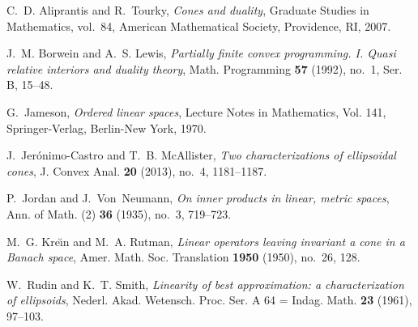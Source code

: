 \documentclass[10pt]{amsart}
\theoremstyle{definition}
\theoremstyle{remark}
\begin{document}
\providecommand{\bysame}{\leavevmode\hbox to3em{\hrulefill}\thinspace}
\providecommand{\MR}{\relax\ifhmode\unskip\space\fi MR }
\providecommand{\MRhref}[2]{  \href{http://www.ams.org/mathscinet-getitem?mr=#1}{#2}
}
\providecommand{\href}[2]{#2}
\begin{thebibliography}{1}

C.~D. Aliprantis and R.~Tourky, \emph{Cones and duality}, Graduate Studies in
  Mathematics, vol.~84, American Mathematical Society, Providence, RI, 2007.

J.~M. Borwein and A.~S. Lewis, \emph{Partially finite convex programming. {I}.
  {Q}uasi relative interiors and duality theory}, Math. Programming \textbf{57}
  (1992), no.~1, Ser. B, 15--48.

G.~Jameson, \emph{Ordered linear spaces}, Lecture Notes in Mathematics, Vol.
  141, Springer-Verlag, Berlin-New York, 1970.

J.~Jer{\'o}nimo-Castro and T.~B. McAllister, \emph{Two characterizations of
  ellipsoidal cones}, J. Convex Anal. \textbf{20} (2013), no.~4, 1181--1187.

P.~Jordan and J.~Von~Neumann, \emph{On inner products in linear, metric
  spaces}, Ann. of Math. (2) \textbf{36} (1935), no.~3, 719--723.

M.~G. Kre{\u\i}n and M.~A. Rutman, \emph{Linear operators leaving invariant a
  cone in a {B}anach space}, Amer. Math. Soc. Translation \textbf{1950} (1950),
  no.~26, 128.

W.~Rudin and K.~T. Smith, \emph{Linearity of best approximation: a
  characterization of ellipsoids}, Nederl. Akad. Wetensch. Proc. Ser. A 64 =
  Indag. Math. \textbf{23} (1961), 97--103.

\end{thebibliography}
\end{document}
